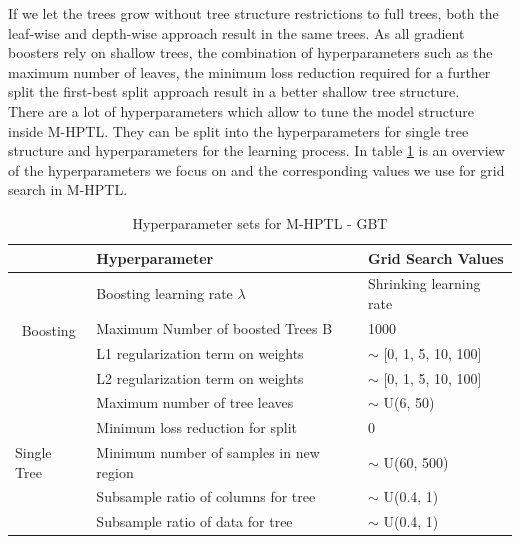 \documentclass[12pt,titlepage]{article}
\begin{document}
If we let the trees grow without tree structure restrictions to full trees, both the leaf-wise and depth-wise approach result in the same trees. As all gradient boosters rely on shallow trees, the combination of hyperparameters such as the maximum number of leaves, the minimum loss reduction required for a further split the first-best split approach result in a better shallow tree structure. \\
There are a lot of hyperparameters which allow to tune the model structure inside M-HPTL. They can be split into the hyperparameters for single tree structure and hyperparameters for the learning process. In table \ref{hplgbm} is an overview of the hyperparameters we focus on and the corresponding values we use for grid search in M-HPTL. \\
\begin{table}[H]
    \centering
    \begin{tabular}{|c|l|l|}
    \hline
    \multicolumn{1}{|l|}{}                                       & Hyperparameter                            & Grid Search Values       \\
    \hline
    \multirow{4}{*}{\begin{sideways} Boosting \end{sideways}}                         & Boosting learning rate $\lambda$                                                                & Shrinking learning rate  \\
    & Maximum Number of boosted Trees B      &        1000                       \\
    & L1 regularization term on weights      &        $\sim$ [0, 1, 5, 10, 100]         \\
    & L2 regularization term on weights      &        $\sim$ [0, 1, 5, 10, 100]         \\
    \hline
    \multicolumn{1}{|l|}{\multirow{5}{*}{\begin{sideways} Single Tree \end{sideways}}} & Maximum number of tree leaves          &        $\sim$ U(6, 50)           \\
    \multicolumn{1}{|l|}{}                                       & Minimum loss reduction for split       &         0                 \\
    \multicolumn{1}{|l|}{}                                       & Minimum number of samples in new region   &      $\sim$ U(60, 500)         \\
    \multicolumn{1}{|l|}{}                                              & Subsample ratio of columns for tree    &     $\sim$ U(0.4, 1)         \\
    \multicolumn{1}{|l|}{}                                              & Subsample ratio of data for tree &          $\sim$ U(0.4, 1)            \\
    \hline
    \end{tabular}
    \caption{Hyperparameter sets for M-HPTL - GBT}
\label{hplgbm}
\end{table}
\end{document}
